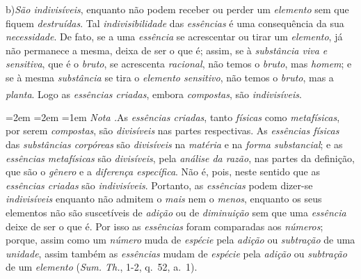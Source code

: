 \documentclass[12pt,a4paper]{article}
\newcommand{\sub}[2]{\medskip\noindent#1)\quad\emph{#2},\;\textemdash\;}
\renewcommand\footnote[1]{%
    \stepcounter{footnote}\textsuperscript{\thefootnote}%
    \par
    {\footnotesize
     \leftskip=2em \rightskip=2em \parindent=1em
     \addvspace{\medskipamount}%
     \noindent\textit{Nota \thefootnote.}\enspace #1\par
     \addvspace{\medskipamount}}%
  }
\begin{document}
\sub{b}{São indivisíveis} enquanto não podem receber ou perder um
\emph{elemento} sem que fiquem \emph{destruídas}. Tal \emph{indivisibilidade}
das \emph{essências} é uma consequência da sua \emph{necessidade}. De fato, se
a uma \emph{essência} se acrescentar ou tirar um \emph{elemento}, já não
permanece a mesma, deixa de ser o que é; assim, se à \emph{substância viva e
sensitiva}, que é o \emph{bruto}, se acrescenta \emph{racional}, não temos o
\emph{bruto}, mas \emph{homem}; e se à mesma \emph{substância} se tira o
\emph{elemento sensitivo}, não temos o \emph{bruto}, mas a \emph{planta}. Logo
as \emph{essências criadas}, embora \emph{compostas}, são
\emph{indivisíveis}.\footnote{As \emph{essências criadas}, tanto \emph{físicas}
como \emph{metafísicas}, por serem \emph{compostas}, são \emph{divisíveis} nas
partes respectivas. As \emph{essências físicas} das \emph{substâncias
corpóreas} são \emph{divisíveis} na \emph{matéria} e na \emph{forma
substancial}; e as \emph{essências metafísicas} são \emph{divisíveis}, pela
\emph{análise da razão}, nas partes da definição, que são o \emph{gênero} e a
\emph{diferença específica}. Não é, pois, neste sentido que as \emph{essências
criadas} são \emph{indivisíveis}. Portanto, as \emph{essências} podem
dizer-se \emph{indivisíveis} enquanto não admitem o \emph{mais} nem o
\emph{menos}, enquanto os seus elementos não são suscetíveis de \emph{adição}
ou de \emph{diminuição} sem que uma \emph{essência} deixe de ser o que é. Por
isso as \emph{essências} foram comparadas aos \emph{números}; porque, assim
como um \emph{número} muda de \emph{espécie} pela \emph{adição} ou
\emph{subtração} de uma \emph{unidade}, assim também as \emph{essências} mudam
de \emph{espécie} pela \emph{adição} ou \emph{subtração} de um \emph{elemento}
(\emph{Sum. Th.}, 1-2, q.~52, a.~1).}
\end{document}
